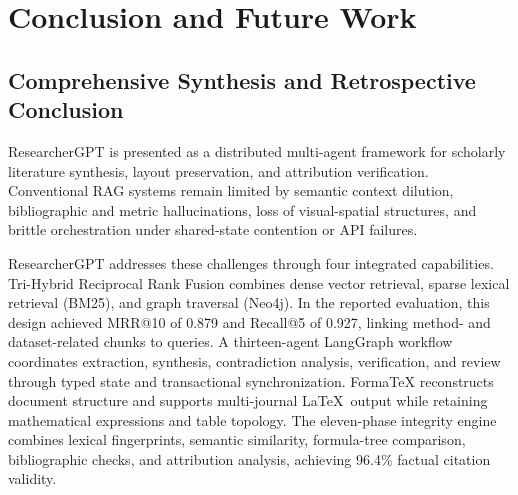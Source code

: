 \documentclass[conference]{IEEEtran}
\begin{document}
\section{Conclusion and Future Work}
\subsection{Comprehensive Synthesis and Retrospective Conclusion}
ResearcherGPT is presented as a distributed multi-agent framework for scholarly literature synthesis, layout preservation, and attribution verification. Conventional RAG systems remain limited by semantic context dilution, bibliographic and metric hallucinations, loss of visual-spatial structures, and brittle orchestration under shared-state contention or API failures.

ResearcherGPT addresses these challenges through four integrated capabilities. Tri-Hybrid Reciprocal Rank Fusion combines dense vector retrieval, sparse lexical retrieval (BM25), and graph traversal (Neo4j). In the reported evaluation, this design achieved MRR@10 of 0.879 and Recall@5 of 0.927, linking method- and dataset-related chunks to queries. A thirteen-agent LangGraph workflow coordinates extraction, synthesis, contradiction analysis, verification, and review through typed state and transactional synchronization. FormaTeX reconstructs document structure and supports multi-journal \LaTeX\ output while retaining mathematical expressions and table topology. The eleven-phase integrity engine combines lexical fingerprints, semantic similarity, formula-tree comparison, bibliographic checks, and attribution analysis, achieving 96.4\% factual citation validity.
\end{document}

